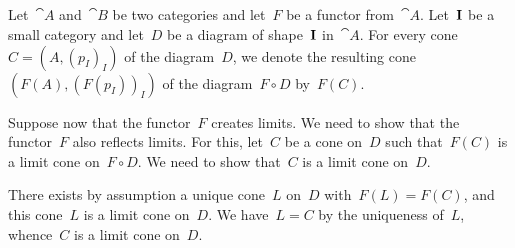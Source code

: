 \subsection{}

Let~$\cat{A}$ and~$\cat{B}$ be two categories and let~$F$ be a functor from~$\cat{A}$.
Let~$\mathbf{I}$ be a small category and let~$D$ be a diagram of shape~$\mathbf{I}$ in~$\cat{A}$.
For every cone~$C = (A, (p_I)_I)$ of the diagram~$D$, we denote the resulting cone~$(F(A), (F(p_I))_I)$ of the diagram~$F ∘ D$ by~$F(C)$.

Suppose now that the functor~$F$ creates limits.
We need to show that the functor~$F$ also reflects limits.
For this, let~$C$ be a cone on~$D$ such that~$F(C)$ is a limit cone on~$F ∘ D$.
We need to show that~$C$ is a limit cone on~$D$.

There exists by assumption a unique cone~$L$ on~$D$ with~$F(L) = F(C)$, and this cone~$L$ is a limit cone on~$D$.
We have~$L = C$ by the uniqueness of~$L$, whence~$C$ is a limit cone on~$D$.
